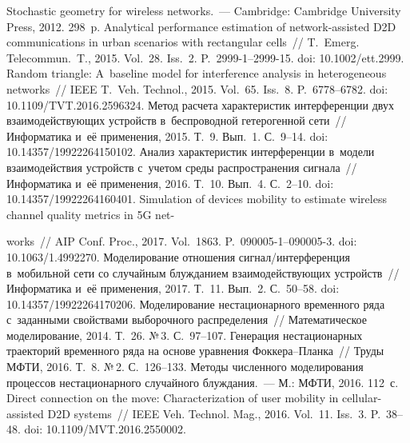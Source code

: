 \begin{multicols}{2}
{{\begin{thebibliography}{99}
 Stochastic geometry for wireless networks.~--- Cambridge: Cambridge University 
Press, 2012. 298~p.
 Analytical performance estimation of  
network-assisted D2D communications in urban scenarios with rectangular cells~// 
T.~Emerg. Telecommun.~T., 2015. Vol.~28. Iss.~2. P.~2999-1--2999-15.
doi: 10.1002/ett.2999.
 Random 
triangle: A~baseline model for interference analysis in heterogeneous networks~// IEEE 
T.~Veh. Technol., 2015. Vol.~65. Iss.~8. P.~6778--6782.
doi: 10.1109/TVT.2016.2596324.
 Метод расчета характеристик интерференции двух 
взаимо\-дей\-ст\-ву\-ющих устройств в~беспроводной гетерогенной сети~// Информатика и~её 
применения, 2015. Т.~9. Вып.~1. С.~9--14. doi: 10.14357/19922264150102.
Анализ характеристик интерференции в~модели взаимодействия устройств с~учетом среды 
распространения сигнала~// Информатика и~её применения, 2016. Т.~10. 
Вып.~4. С.~2--10. doi:  10.14357/19922264160401.
Simulation of devices mobility to estimate wireless channel quality metrics in 5G net-\linebreak\vspace*{-12pt}

\pagebreak

\noindent
works~// AIP 
Conf. Proc., 2017. Vol.~1863. P.~090005-1--090005-3. doi: 10.1063/1.4992270.
 Моделирование 
отношения сигнал/ин\-тер\-фе\-рен\-ция в~мобильной сети со случайным блуж\-да\-ни\-ем 
взаимодействующих устройств~// Информатика и~её применения, 2017. Т.~11. Вып.~2. 
С.~50--58. doi:  10.14357/19922264170206.
 Мо\-де\-ли\-рование нестационарного 
временного ряда с~за\-данными свойствами выборочного распределения~// Математическое 
моделирование, 2014. Т.~26. №\,3. С.~97--107.
 Генерация нестационарных траекторий временного ряда 
на основе уравнения Фок\-ке\-ра--План\-ка~// Труды МФТИ, 2016. Т.~8. №\,2. С.~126--133.
 Методы численного моделирования процессов 
нестационарного случайного блуждания.~--- М.: МФТИ, 2016. 112~с.
 Direct connection on the move: Characterization of user mobility in 
cellular-assisted D2D systems~// IEEE Veh. Technol. Mag., 2016. Vol.~11. Iss.~3. 
P.~38--48. doi:  10.1109/MVT.2016.2550002.
 \end{thebibliography}

 }
 }

\end{multicols}

